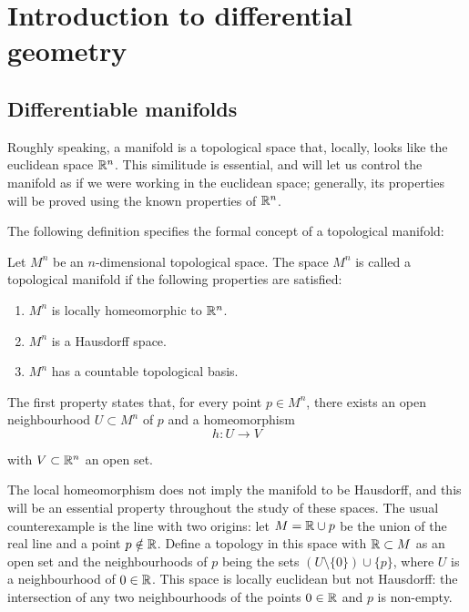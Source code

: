 \chapter{Introduction to differential geometry}

\section{Differentiable manifolds}

Roughly speaking, a manifold is a topological space that, locally, looks like the euclidean space $\mathbb{R}^n$. This similitude is essential, and will let us control the manifold as if we were working in the euclidean space; generally, its properties will be proved using the known properties of $\mathbb{R}^n$.

The following definition specifies the formal concept of a topological manifold:

\begin{definition}
    Let $M^n$ be an $n$-dimensional topological space. The space $M^n$ is called a topological manifold if the following properties are satisfied:
    \begin{enumerate}
        \item $M^n$ is locally homeomorphic to $\mathbb{R}^n$. \label{def:manifold:homeo}
        \item $M^n$ is a Hausdorff space. \label{def:manifold:haussdorf}
        \item $M^n$ has a countable topological basis. \label{def:manifold:basis}
    \end{enumerate}
\end{definition}

The first property states that, for every point $p \in M^n$, there exists an open neighbourhood $U \subset M^n$ of $p$ and a homeomorphism
\[
    h \colon U \to V
\]

with $V \subset \mathbb{R}^n$ an open set.

The local homeomorphism does not imply the manifold to be Hausdorff, and this will be an essential property throughout the study of these spaces. The usual counterexample is the line with two origins: let $M = \mathbb{R} \cup p$ be the union of the real line and a point $p \notin \mathbb{R}$. Define a topology in this space with $\mathbb{R} \subset M$ as an open set and the neighbourhoods of $p$ being the sets $(U \setminus \{0\}) \cup \{p\}$, where $U$ is a neighbourhood of $0 \in \mathbb{R}$. This space is locally euclidean but not Hausdorff: the intersection of any two neighbourhoods of the points $0 \in \mathbb{R}$ and $p$ is non-empty.

